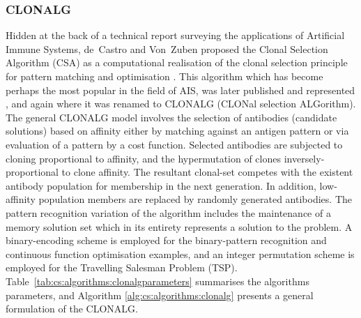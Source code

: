 %
%
\subsubsection{CLONALG}
\label{subsubsec:cs:taxonomy:clonalg}
Hidden at the back of a technical report surveying the applications of Artificial Immune Systems, de~Castro and Von~Zuben  proposed the Clonal Selection Algorithm (CSA) as a computational realisation of the clonal selection principle for pattern matching and optimisation \cite{Castro1999}. This algorithm which has become perhaps the most popular in the field of AIS, was later published and represented \cite{Castro2000}, and again \cite{Castro2002} where it was renamed to CLONALG (CLONal selection ALGorithm). The general CLONALG model involves the selection of antibodies (candidate solutions) based on affinity either by matching against an antigen pattern or via evaluation of a pattern by a cost function. Selected antibodies are subjected to cloning proportional to affinity, and the hypermutation of clones inversely-proportional to clone affinity. The resultant clonal-set competes with the existent antibody population for membership in the next generation. In addition, low-affinity population members are replaced by randomly generated antibodies. The pattern recognition variation of the algorithm includes the maintenance of a memory solution set which in its entirety represents a solution to the problem. A binary-encoding scheme is employed for the binary-pattern recognition and continuous function optimisation examples, and an integer permutation scheme is employed for the Travelling Salesman Problem (TSP). Table~\ref{tab:cs:algorithms:clonalgparameters} summarises the algorithms parameters, and Algorithm \ref{alg:cs:algorithms:clonalg} presents a general formulation of the CLONALG.

